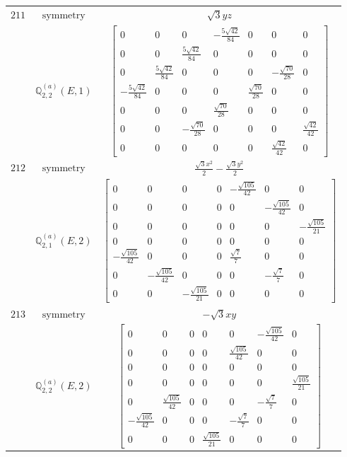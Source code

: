 \documentclass[fleqn,8pt,landscape]{jsarticle}
\begin{document}
\begin{longtable}{ccc}
$ 211 $ & $ \text{symmetry} $ & $ \sqrt{3} y z $ \\
$  $ & $ \mathbb{Q}_{2,2}^{(a)}(E,1) $ & $ \begin{bmatrix} 0 & 0 & 0 & - \frac{5 \sqrt{42}}{84} & 0 & 0 & 0 \\ 0 & 0 & \frac{5 \sqrt{42}}{84} & 0 & 0 & 0 & 0 \\ 0 & \frac{5 \sqrt{42}}{84} & 0 & 0 & 0 & - \frac{\sqrt{70}}{28} & 0 \\ - \frac{5 \sqrt{42}}{84} & 0 & 0 & 0 & \frac{\sqrt{70}}{28} & 0 & 0 \\ 0 & 0 & 0 & \frac{\sqrt{70}}{28} & 0 & 0 & 0 \\ 0 & 0 & - \frac{\sqrt{70}}{28} & 0 & 0 & 0 & \frac{\sqrt{42}}{42} \\ 0 & 0 & 0 & 0 & 0 & \frac{\sqrt{42}}{42} & 0 \end{bmatrix} $ \\ \hline
$ 212 $ & $ \text{symmetry} $ & $ \frac{\sqrt{3} x^{2}}{2} - \frac{\sqrt{3} y^{2}}{2} $ \\
$  $ & $ \mathbb{Q}_{2,1}^{(a)}(E,2) $ & $ \begin{bmatrix} 0 & 0 & 0 & 0 & - \frac{\sqrt{105}}{42} & 0 & 0 \\ 0 & 0 & 0 & 0 & 0 & - \frac{\sqrt{105}}{42} & 0 \\ 0 & 0 & 0 & 0 & 0 & 0 & - \frac{\sqrt{105}}{21} \\ 0 & 0 & 0 & 0 & 0 & 0 & 0 \\ - \frac{\sqrt{105}}{42} & 0 & 0 & 0 & \frac{\sqrt{7}}{7} & 0 & 0 \\ 0 & - \frac{\sqrt{105}}{42} & 0 & 0 & 0 & - \frac{\sqrt{7}}{7} & 0 \\ 0 & 0 & - \frac{\sqrt{105}}{21} & 0 & 0 & 0 & 0 \end{bmatrix} $ \\ \hline
$ 213 $ & $ \text{symmetry} $ & $ - \sqrt{3} x y $ \\
$  $ & $ \mathbb{Q}_{2,2}^{(a)}(E,2) $ & $ \begin{bmatrix} 0 & 0 & 0 & 0 & 0 & - \frac{\sqrt{105}}{42} & 0 \\ 0 & 0 & 0 & 0 & \frac{\sqrt{105}}{42} & 0 & 0 \\ 0 & 0 & 0 & 0 & 0 & 0 & 0 \\ 0 & 0 & 0 & 0 & 0 & 0 & \frac{\sqrt{105}}{21} \\ 0 & \frac{\sqrt{105}}{42} & 0 & 0 & 0 & - \frac{\sqrt{7}}{7} & 0 \\ - \frac{\sqrt{105}}{42} & 0 & 0 & 0 & - \frac{\sqrt{7}}{7} & 0 & 0 \\ 0 & 0 & 0 & \frac{\sqrt{105}}{21} & 0 & 0 & 0 \end{bmatrix} $ \\ \hline

\end{longtable}
\end{document}
